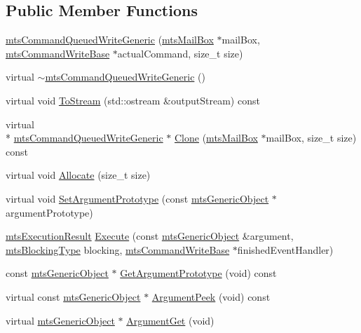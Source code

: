 \subsection*{Public Member Functions}
\begin{DoxyCompactItemize}
\item 
\hyperlink{classmts_command_queued_write_generic_aaafdcc6e3828ed2308806cd33da98c58}{mts\-Command\-Queued\-Write\-Generic} (\hyperlink{classmts_mail_box}{mts\-Mail\-Box} $\ast$mail\-Box, \hyperlink{classmts_command_write_base}{mts\-Command\-Write\-Base} $\ast$actual\-Command, size\-\_\-t size)
\item 
virtual \hyperlink{classmts_command_queued_write_generic_af6ee1d684b4a16823d61a85cd619c900}{$\sim$mts\-Command\-Queued\-Write\-Generic} ()
\item 
virtual void \hyperlink{classmts_command_queued_write_generic_a08ecb69cf7b48addc3ac1c2c00749862}{To\-Stream} (std\-::ostream \&output\-Stream) const 
\item 
virtual \\*
\hyperlink{classmts_command_queued_write_generic}{mts\-Command\-Queued\-Write\-Generic} $\ast$ \hyperlink{classmts_command_queued_write_generic_a19ab52abd7a5763ca948dfedb561956b}{Clone} (\hyperlink{classmts_mail_box}{mts\-Mail\-Box} $\ast$mail\-Box, size\-\_\-t size) const 
\item 
virtual void \hyperlink{classmts_command_queued_write_generic_a126f75b549a510e4ec11a5f2e48b570d}{Allocate} (size\-\_\-t size)
\item 
virtual void \hyperlink{classmts_command_queued_write_generic_a49574e06b777c7122675adb3022993ef}{Set\-Argument\-Prototype} (const \hyperlink{classmts_generic_object}{mts\-Generic\-Object} $\ast$argument\-Prototype)
\item 
\hyperlink{classmts_execution_result}{mts\-Execution\-Result} \hyperlink{classmts_command_queued_write_generic_ac80ac62ca14d0714e1090305e189d13d}{Execute} (const \hyperlink{classmts_generic_object}{mts\-Generic\-Object} \&argument, \hyperlink{mts_forward_declarations_8h_ad7426ccb6c883bc780d0ee197dddcbe7}{mts\-Blocking\-Type} blocking, \hyperlink{classmts_command_write_base}{mts\-Command\-Write\-Base} $\ast$finished\-Event\-Handler)
\item 
const \hyperlink{classmts_generic_object}{mts\-Generic\-Object} $\ast$ \hyperlink{classmts_command_queued_write_generic_a0213856735a304c121713cfa32e90f70}{Get\-Argument\-Prototype} (void) const 
\item 
virtual const \hyperlink{classmts_generic_object}{mts\-Generic\-Object} $\ast$ \hyperlink{classmts_command_queued_write_generic_a1a165e04b368372046169d786335588f}{Argument\-Peek} (void) const 
\item 
virtual \hyperlink{classmts_generic_object}{mts\-Generic\-Object} $\ast$ \hyperlink{classmts_command_queued_write_generic_adb83e8e295b8fca5b5d998fcc123083d}{Argument\-Get} (void)
\end{DoxyCompactItemize}
